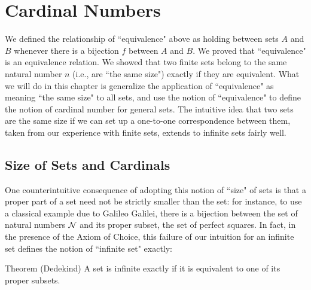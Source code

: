 \chapter{Cardinal Numbers}

We defined the relationship of ``equivalence" above as holding between sets $A$ and $B$ whenever
there is a bijection $f$ between $A$ and $B$.  We proved that
``equivalence" is an equivalence relation.  We showed that two finite sets belong
to the same natural number $n$ (i.e., are ``the same
size") exactly if they are equivalent.
What we will do in this chapter is generalize the application of ``equivalence"
as meaning ``the same size" to all sets, and use the notion of
``equivalence" to define the notion of cardinal number for general sets.  The intuitive idea that two sets
are the same size if we can set up a one-to-one correspondence between them, taken from our experience with
finite sets, extends to infinite 
sets fairly well.




\section{Size of Sets and Cardinals}

One counterintuitive consequence of adopting this notion of
``size" of sets is that a proper part of a set need not be strictly
smaller than the set:  for instance, to use a classical example due to
Galileo Galilei, there is a bijection between the set of
natural numbers ${\cal N}$ and its proper subset, the set
of perfect squares.  In fact, in the presence of the Axiom of
Choice, this failure of our intuition 
for an infinite set defines the notion of ``infinite set" exactly:

\begin{Thm}{Theorem (Dedekind)}
 A set is infinite exactly if it is
 equivalent to one of its proper subsets.
\end{Thm}\label{thm-dedekind}


